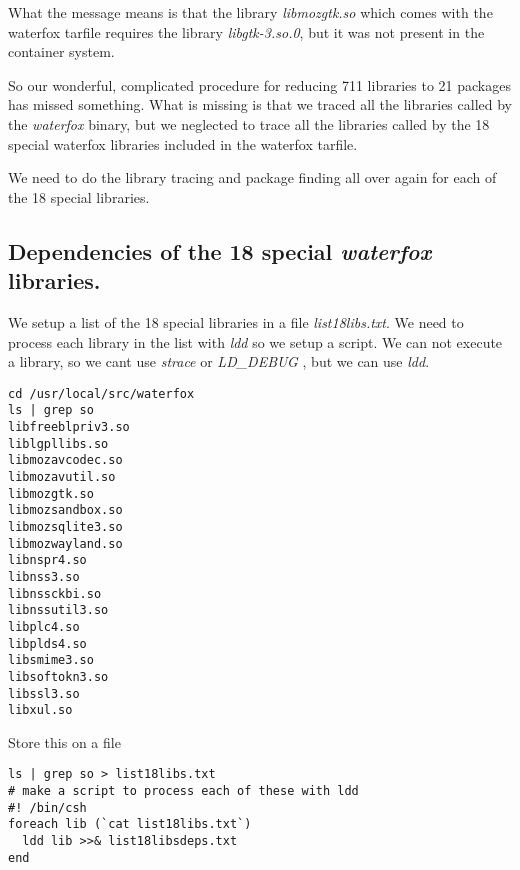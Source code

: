 \documentclass[a4paper]{article}  %
\begin{document}
 What the message means is that the library {\em libmozgtk.so} which comes with the waterfox tarfile requires the library {\em libgtk-3.so.0}, but it was not present in the container system.

So our wonderful, complicated procedure for reducing 711 libraries to 21 packages has missed something. What is missing is that we traced all the libraries called by the {\em waterfox} binary, but we neglected to trace all the libraries called by the 18 special waterfox libraries included in the waterfox tarfile. 

We need to do the library tracing and package finding all over again for each of the 18 special libraries. 

\subsection{Dependencies of the 18 special {\em waterfox} libraries.}
We setup a list of the 18 special libraries in a file {\em list18libs.txt}. We need to process each library in the list with {\em ldd} so we setup a script. We can not execute a library, so we cant use {\em strace} or {\em LD\_DEBUG} , but we can use {\em ldd}.
\begin{tcolorbox}
\begin{verbatim}
cd /usr/local/src/waterfox
ls | grep so 
libfreeblpriv3.so
liblgpllibs.so
libmozavcodec.so
libmozavutil.so
libmozgtk.so
libmozsandbox.so
libmozsqlite3.so
libmozwayland.so
libnspr4.so
libnss3.so
libnssckbi.so
libnssutil3.so
libplc4.so
libplds4.so
libsmime3.so
libsoftokn3.so
libssl3.so
libxul.so
\end{verbatim}
\end{tcolorbox}

 Store this on a file
\begin{lstlisting}
ls | grep so > list18libs.txt
# make a script to process each of these with ldd
#! /bin/csh
foreach lib (`cat list18libs.txt`)
  ldd lib >>& list18libsdeps.txt
end
\end{lstlisting}
\end{document}
